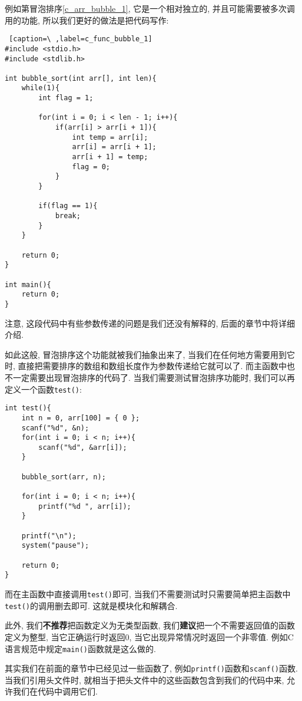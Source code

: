        例如第冒泡排序\ref{c_arr_bubble_1}, 它是一个相对独立的, 并且可能需要被多次调用的功能, 所以我们更好的做法是把代码写作:
\begin{lstlisting} [caption=\ ,label=c_func_bubble_1]
#include <stdio.h>
#include <stdlib.h>

int bubble_sort(int arr[], int len){
    while(1){
        int flag = 1;

        for(int i = 0; i < len - 1; i++){
            if(arr[i] > arr[i + 1]){
                int temp = arr[i];
                arr[i] = arr[i + 1];
                arr[i + 1] = temp;
                flag = 0;
            }
        }

        if(flag == 1){
            break;
        }
    }

    return 0;
}

int main(){
    return 0;
}
\end{lstlisting}

        注意, 这段代码中有些参数传递的问题是我们还没有解释的, 后面的章节中将详细介绍.

        如此这般, 冒泡排序这个功能就被我们抽象出来了, 当我们在任何地方需要用到它时, 直接把需要排序的数组和数组长度作为参数传递给它就可以了. 而主函数中也不一定需要出现冒泡排序的代码了. 当我们需要测试冒泡排序功能时, 我们可以再定义一个函数\texttt{test()}:
\begin{lstlisting}
int test(){
    int n = 0, arr[100] = { 0 };
    scanf("%d", &n);
    for(int i = 0; i < n; i++){
        scanf("%d", &arr[i]);
    }

    bubble_sort(arr, n);

    for(int i = 0; i < n; i++){
        printf("%d ", arr[i]);
    }

    printf("\n");
    system("pause");

    return 0;
}
\end{lstlisting}

        而在主函数中直接调用\texttt{test()}即可, 当我们不需要测试时只需要简单把主函数中\texttt{test()}的调用删去即可. 这就是模块化和解耦合.

        此外, 我们\textbf{不推荐}把函数定义为无类型函数, 我们\textbf{建议}把一个不需要返回值的函数定义为整型, 当它正确运行时返回0, 当它出现异常情况时返回一个非零值. 例如C语言规范中规定\texttt{main()}函数就是这么做的.

        其实我们在前面的章节中已经见过一些函数了, 例如\texttt{printf()}函数和\texttt{scanf()}函数. 当我们引用头文件时, 就相当于把头文件中的这些函数包含到我们的代码中来, 允许我们在代码中调用它们.

